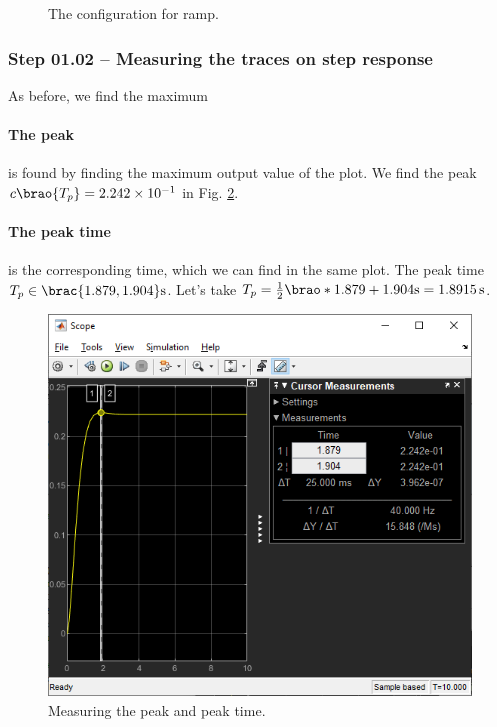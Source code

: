 \documentclass[12pt]{article}
\DeclarePairedDelimiter\brao()%
\DeclarePairedDelimiter\brac[]%
\begin{document}
\begin{figure}[h]
    \centering
    \caption{The configuration for ramp.}
    \label{fig:ramp response model parameters}
\end{figure}

\subsubsection{Step 01.02 -- Measuring the traces on step response}

As before, we find the maximum

\paragraph{The peak} is found by finding the maximum output value of the plot.
We find the peak $c\brao{T_p} = \num{2.242e-1}$ in Fig. \ref{fig:step - measuring peak}.

\paragraph{The peak time} is the corresponding time, which we can find in the same plot.
The peak time $T_p \in \brac{{1.879}, {1.904}}\si\second$.
Let's take $T_p = \frac12\brao*{1.879 + 1.904}\si\second = \SI{1.8915}\second$.

\begin{figure}[h]
    \centering
    \includegraphics[width=\linewidth]{part01a_measuring_peak.png}
    \caption{Measuring the peak and peak time.}
    \label{fig:step - measuring peak}
\end{figure}
\end{document}
